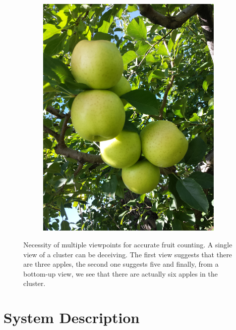 \begin{figure}[htb]
\begin{subfigure}[t]{0.3\textwidth}
    \includegraphics[width=\textwidth]{figures/active_counting/appleview3.jpg}
\end{subfigure}
        
        
        \caption[Necessity of multiple viewpoints for accurate fruit counting.]{Necessity of multiple viewpoints for accurate fruit counting. A single view of a cluster can be deceiving. The first view suggests that there are three apples, the second one suggests five and finally, from a bottom-up view, we see that there are actually six apples in the cluster.
\label{fig:compl}}
\end{figure}
\section{System Description}\label{sec:sysdes}

